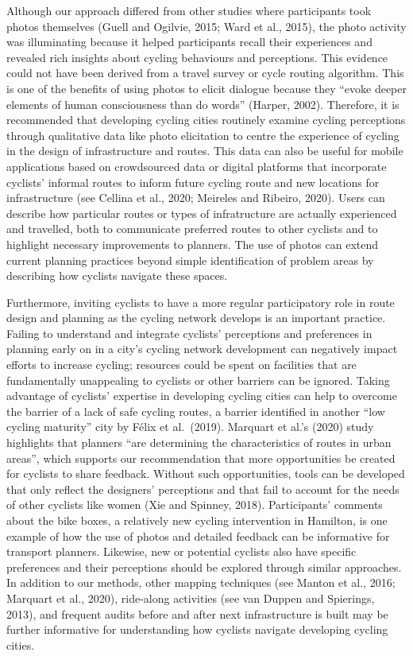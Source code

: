 \documentclass[]{elsarticle} %
\begin{document}
Although our approach differed from other studies where participants
took photos themselves (Guell and Ogilvie, 2015; Ward et al., 2015), the
photo activity was illuminating because it helped participants recall
their experiences and revealed rich insights about cycling behaviours
and perceptions. This evidence could not have been derived from a travel
survey or cycle routing algorithm. This is one of the benefits of using
photos to elicit dialogue because they ``evoke deeper elements of human
consciousness than do words'' (Harper, 2002). Therefore, it is
recommended that developing cycling cities routinely examine cycling
perceptions through qualitative data like photo elicitation to centre
the experience of cycling in the design of infrastructure and routes.
This data can also be useful for mobile applications based on
crowdsourced data or digital platforms that incorporate cyclists'
informal routes to inform future cycling route and new locations for
infrastructure (see Cellina et al., 2020; Meireles and Ribeiro, 2020).
Users can describe how particular routes or types of infratructure are
actually experienced and travelled, both to communicate preferred routes
to other cyclists and to highlight necessary improvements to planners.
The use of photos can extend current planning practices beyond simple
identification of problem areas by describing how cyclists navigate
these spaces.

Furthermore, inviting cyclists to have a more regular participatory role
in route design and planning as the cycling network develops is an
important practice. Failing to understand and integrate cyclists'
perceptions and preferences in planning early on in a city's cycling
network development can negatively impact efforts to increase cycling;
resources could be spent on facilities that are fundamentally
unappealing to cyclists or other barriers can be ignored. Taking
advantage of cyclists' expertise in developing cycling cities can help
to overcome the barrier of a lack of safe cycling routes, a barrier
identified in another ``low cycling maturity'' city by Félix et
al.~(2019). Marquart et al.'s (2020) study highlights that planners
``are determining the characteristics of routes in urban areas'', which
supports our recommendation that more opportunities be created for
cyclists to share feedback. Without such opportunities, tools can be
developed that only reflect the designers' perceptions and that fail to
account for the needs of other cyclists like women (Xie and Spinney,
2018). Participants' comments about the bike boxes, a relatively new
cycling intervention in Hamilton, is one example of how the use of
photos and detailed feedback can be informative for transport planners.
Likewise, new or potential cyclists also have specific preferences and
their perceptions should be explored through similar approaches. In
addition to our methods, other mapping techniques (see Manton et al.,
2016; Marquart et al., 2020), ride-along activities (see van Duppen and
Spierings, 2013), and frequent audits before and after next
infrastructure is built may be further informative for understanding how
cyclists navigate developing cycling cities.
\end{document}
